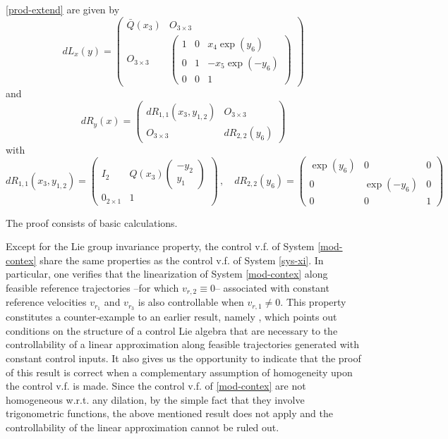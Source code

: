 \documentclass[a4paper,twoside]{article}
\def \finproof{\hfill\hbox{\vrule width1.0ex height1.5ex}}
\begin{document}
\begin{theorem}
\begin{enumerate}
\eqref{prod-extend} are given by
\[
dL_x(y)=\begin{pmatrix} \bar Q (x_3) & O_{3 \times 3} \\ O_{3 \times 3} &
\begin{pmatrix} 1 & 0 & x_4 \exp(y_6)\\0 & 1 & -x_5 \exp(-y_6) \\ 0 & 0 & 1 \end{pmatrix}
\end{pmatrix}
\]
and
\[
dR_y(x)=\begin{pmatrix}
dR_{1,1}(x_3,y_{1,2}) & O_{3 \times 3}\\
O_{3 \times 3} & dR_{2,2}(y_6)
\end{pmatrix}
\]
with
\[
dR_{1,1}(x_3,y_{1,2})=\begin{pmatrix} I_2  & Q(x_3) \begin{pmatrix} -y_2 \\ y_1 \end{pmatrix} \\ 0_{2 \times 1} 
& 1 \end{pmatrix} \, , \quad 
dR_{2,2}(y_6)=\begin{pmatrix} \exp(y_6) & 0 & 0 \\0 & \exp(-y_6) & 0 \\ 0 & 0 & 1 \end{pmatrix}
\]
\end{enumerate}
\end{theorem} 
 The proof consists of basic calculations. \finproof
\vspace{.2cm}

Except for the Lie group invariance property, the control v.f. of System \eqref{mod-contex} share the 
same properties as the control v.f. of  System \eqref{sys-xi}. In particular, one verifies that the
linearization of System \eqref{mod-contex} along feasible reference trajectories --for which $v_{r,2}\equiv 0$-- associated 
with constant reference velocities $v_{r_1}$ and $v_{r_3}$ is also controllable when $v_{r,1} \neq 0$. This property constitutes a counter-example to an earlier result, namely \cite[Prop. 2]{ms08-ifac}, which points out conditions on the structure of a control Lie algebra that are necessary to the controllability of a linear approximation along feasible trajectories generated with constant control inputs. It also gives us the opportunity to indicate that the proof of this result is correct when a complementary assumption of homogeneity upon the control v.f. is made. Since the control v.f. of \eqref{mod-contex} are not homogeneous w.r.t. any dilation, by the simple fact that they involve trigonometric functions, the above mentioned result does not apply and the controllability of the linear approximation cannot be ruled out. 
\end{document}
